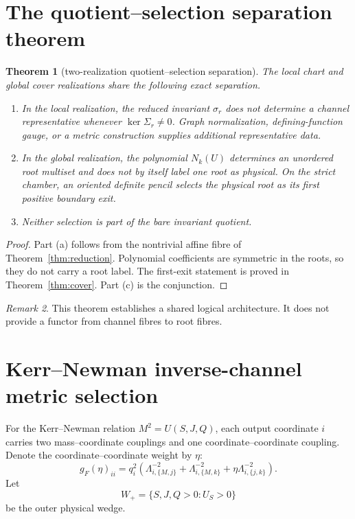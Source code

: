 \documentclass[11pt]{article}
\newtheorem{theorem}{Theorem}[section]
\theoremstyle{remark}
\newtheorem{remark}[theorem]{Remark}
\newcommand{\Wp}{W_+}
\begin{document}
\section{The quotient--selection separation theorem}

\begin{theorem}[two-realization quotient--selection separation]
\label{thm:separation}
The local chart and global cover realizations share the following exact
separation.
\begin{enumerate}[label=(\alph*)]
\item In the local realization, the reduced invariant $\sigma_r$ does not
determine a channel representative whenever $\ker\Sigma_r\neq0$.
Graph normalization, defining-function gauge, or a metric construction
supplies additional representative data.
\item In the global realization, the polynomial $N_k(U)$ determines an
unordered root multiset and does not by itself label one root as physical.
On the strict chamber, an oriented definite pencil selects the physical root
as its first positive boundary exit.
\item Neither selection is part of the bare invariant quotient.
\end{enumerate}
\end{theorem}

\begin{proof}
Part (a) follows from the nontrivial affine fibre of
Theorem~\ref{thm:reduction}. Polynomial coefficients are symmetric in the
roots, so they do not carry a root label. The first-exit statement is proved
in Theorem~\ref{thm:cover}. Part (c) is the conjunction.
\end{proof}

\begin{remark}
This theorem establishes a shared logical architecture. It does not provide a
functor from channel fibres to root fibres.
\end{remark}

\section{Kerr--Newman inverse-channel metric selection}

For the Kerr--Newman relation $M^2=U(S,J,Q)$, each output coordinate $i$
carries two mass--coordinate couplings and one coordinate--coordinate
coupling. Denote the coordinate--coordinate
weight by $\eta$:
\[
g_F(\eta)_{ii}
=q_i^2\left(
\Lambda_{i,\{M,j\}}^{-2}
+\Lambda_{i,\{M,k\}}^{-2}
+\eta\Lambda_{i,\{j,k\}}^{-2}
\right).
\]
Let
\[
\Wp=\{S,J,Q>0:U_S>0\}
\]
be the outer physical wedge.
\end{document}
